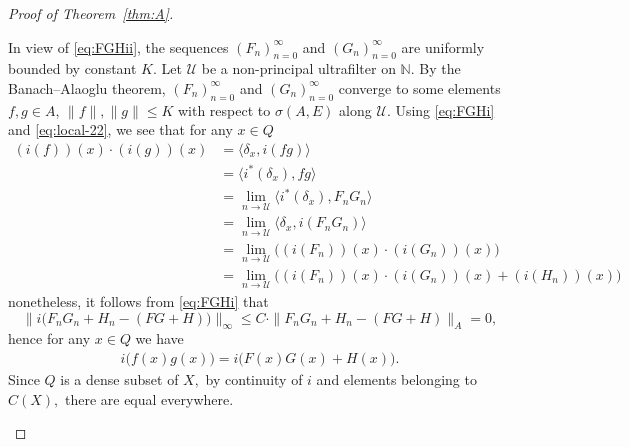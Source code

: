 \documentclass[12pt,fleqn]{amsart}
\theoremstyle{definition}
\numberwithin{equation}{section}
\theoremstyle{remark}
\begin{document}
\begin{proof}[Proof of Theorem~\ref{thm:A}]
\begin{itemize}
In view of \eqref{eq:FGHii}, the sequences $(F_n)_{n=0}^\infty$ and $(G_n)_{n=0}^\infty$ are uniformly bounded by constant $K$. Let $\mathscr U$ be a non-principal ultrafilter on $\mathbb N$. By the Banach--Alaoglu theorem, $(F_n)_{n=0}^\infty$ and $(G_n)_{n=0}^\infty$ converge to some elements $f,g\in A$, $\|f\|, \|g\|\leqslant K$ with respect to $\sigma(A,E)$ along $\mathscr{U}$.
%
Using \eqref{eq:FGHi} and \eqref{eq:local-22}, we see that for any $x\in Q$
%
\begin{equation}\label{eq:local-23}
    \begin{split}
        (i(f))(x)\cdot (i(g))(x) & =  \langle \delta_x, i(fg)\rangle\\
        & =  \langle i^*(\delta_x), fg\rangle\\
        & = \lim_{n\to\mathscr{U}}\langle i^*(\delta_x), F_{n}G_n\rangle\\
          & = \lim_{n\to\mathscr{U}}\langle \delta_x, i(F_{n}G_n)\rangle\\
        & =  \lim_{n\to\mathscr{U}} \big( (i(F_{n}))(x)\cdot (i(G_{n}))(x) \big)\\
        & = \lim_{n\to\mathscr{U}}\big((i(F_{n}))(x) \cdot (i(G_{n}))(x)+(i(H_{n}))(x)\big) 
    \end{split}
\end{equation}
nonetheless, it follows from \eqref{eq:FGHi} that 
%
\[
    \| i\big(F_n G_n + H_n - (FG+H)\big)\|_{\infty}  \leqslant C \cdot \| F_n G_n + H_n - (FG+H)\|_{A} = 0,
\]
%
hence for any $x \in Q$ we have
%
\begin{equation}\label{eq:local-2333}
    \begin{split}
        i \big( f(x)g(x) \big) = i \big( F(x)G(x)+H(x) \big).
    \end{split}
\end{equation}
Since $Q$ is a dense subset of $X,$ by continuity of $i$ and elements belonging to $C(X),$ there are equal everywhere. 

\end{itemize}
\end{proof}
\end{document}
